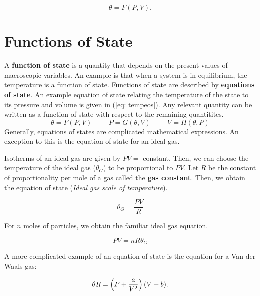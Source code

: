     \begin{equation}
        \theta = F(P,V) .
        \label{eq: tempeos}
    \end{equation}
\section{Functions of State}
\label{sec:1.2Functionsofstate}
    A \textbf{function of state} is a quantity that depends on the present values of macroscopic variables. An example is that when a system is in equilibrium, the temperature is a function of state. Functions of state are described by \textbf{equations of state}. An example equation of state relating the temperature of the state to its pressure and volume is given in (\ref{eq: tempeos}). Any relevant quantity can be written as a function of state with respect to the remaining quantitites.
    \begin{equation*}
        \theta = F(P,V) \hspace{1cm} P = G(\theta,V) \hspace{1cm} V = H(\theta, P)
    \end{equation*}
    Generally, equations of states are complicated mathematical expressions. An exception to this is the equation of state for an ideal gas. 

    \noindent Isotherms of an ideal gas are given by $PV=$ constant. Then, we can choose the temperature of the ideal gas ($\theta_G$) to be proportional to $PV$. Let $R$ be the constant of proportionality per mole of a gas called the \textbf{gas constant}. Then, we obtain the equation of state (\textit{Ideal gas scale of temperature}).
    
    \begin{equation}
        \theta_G = \frac{PV}{R}
    \end{equation}
    
    For $n$ moles of particles, we obtain the familiar ideal gas equation.
    
    \begin{equation}
        PV=nR\theta_G
        \label{eq:idealgas}
    \end{equation} 
    
    A more complicated example of an equation of state is the equation for a Van der Waals gas:
    
    \begin{equation}
        \theta R = \left( P + \frac{a}{V^2} \right)(V-b).
        \label{eq:vdw}
    \end{equation}
    
